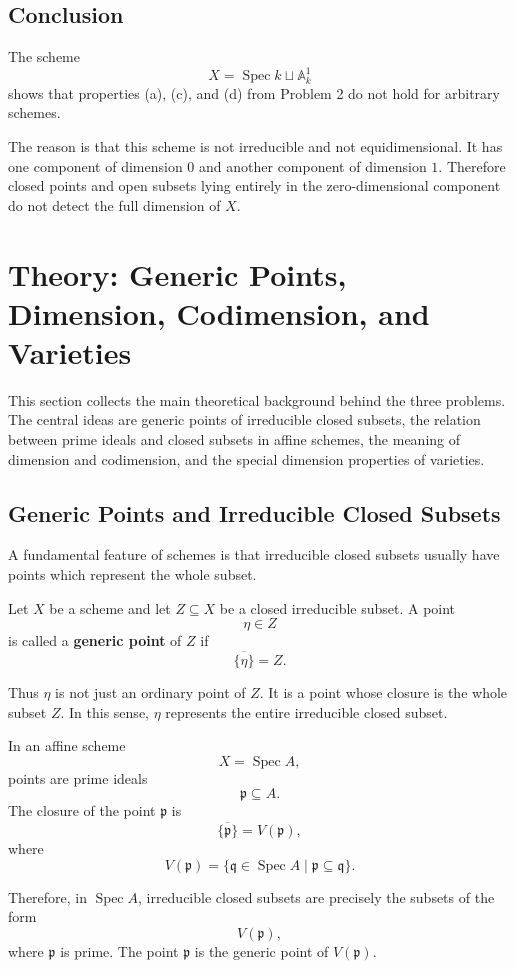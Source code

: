 \documentclass[12pt,a4paper]{article}
\DeclareMathOperator{\Spec}{Spec}
\providecommand{\Spec}{\operatorname{Spec}}
\theoremstyle{notespace}
\begin{document}
\subsection*{Conclusion}

The scheme
\[
X=\Spec k\sqcup \mathbb A^1_k
\]
shows that properties (a), (c), and (d) from Problem 2 do not hold for arbitrary schemes.

The reason is that this scheme is not irreducible and not equidimensional. It has one component of dimension \(0\) and another component of dimension \(1\). Therefore closed points and open subsets lying entirely in the zero-dimensional component do not detect the full dimension of \(X\).


\section{Theory: Generic Points, Dimension, Codimension, and Varieties}

This section collects the main theoretical background behind the three problems. The central ideas are generic points of irreducible closed subsets, the relation between prime ideals and closed subsets in affine schemes, the meaning of dimension and codimension, and the special dimension properties of varieties.

\subsection{Generic Points and Irreducible Closed Subsets}

A fundamental feature of schemes is that irreducible closed subsets usually have points which represent the whole subset.

Let \(X\) be a scheme and let \(Z\subseteq X\) be a closed irreducible subset. A point
\[
\eta\in Z
\]
is called a \textbf{generic point} of \(Z\) if
\[
\overline{\{\eta\}}=Z.
\]

Thus \(\eta\) is not just an ordinary point of \(Z\). It is a point whose closure is the whole subset \(Z\). In this sense, \(\eta\) represents the entire irreducible closed subset.

In an affine scheme
\[
X=\Spec A,
\]
points are prime ideals
\[
\mathfrak p\subseteq A.
\]
The closure of the point \(\mathfrak p\) is
\[
\overline{\{\mathfrak p\}}=V(\mathfrak p),
\]
where
\[
V(\mathfrak p)=\{\mathfrak q\in \Spec A\mid \mathfrak p\subseteq \mathfrak q\}.
\]

Therefore, in \(\Spec A\), irreducible closed subsets are precisely the subsets of the form
\[
V(\mathfrak p),
\]
where \(\mathfrak p\) is prime. The point \(\mathfrak p\) is the generic point of \(V(\mathfrak p)\).
\end{document}
